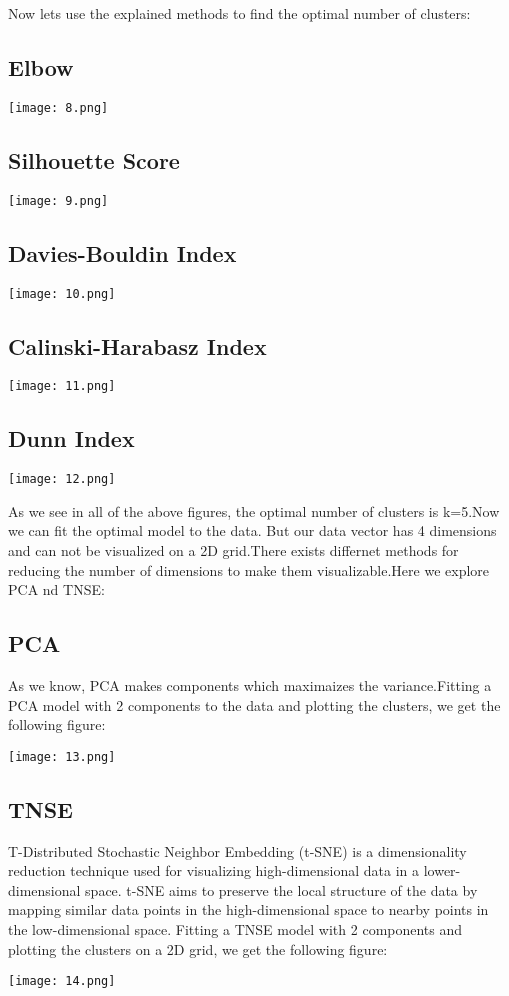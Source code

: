 \documentclass{article}
\begin{document}
Now lets use the explained methods to find the optimal number of clusters:

\subsection*{Elbow}

\texttt{[image: 8.png]}

\subsection*{Silhouette Score}

\texttt{[image: 9.png]}

\subsection*{Davies-Bouldin Index}

\texttt{[image: 10.png]}

\subsection*{Calinski-Harabasz Index}

\texttt{[image: 11.png]}


\subsection*{Dunn Index}

\texttt{[image: 12.png]}

As we see in all of the above figures, the optimal number of clusters is k=5.Now we can fit the optimal model to the data.
But our data vector has 4 dimensions and can not be visualized on a 2D grid.There exists differnet methods for reducing the number of 
dimensions to make them visualizable.Here we explore PCA nd TNSE:

\subsection*{PCA}
As we know, PCA makes components which maximaizes the variance.Fitting a PCA model with 2 components to the data and plotting the clusters,
 we get the following figure:

 \texttt{[image: 13.png]}

\subsection*{TNSE}
T-Distributed Stochastic Neighbor Embedding (t-SNE) is a dimensionality reduction technique used for visualizing high-dimensional data in a lower-dimensional space.
t-SNE aims to preserve the local structure of the data by mapping similar data points in the high-dimensional space to nearby points in the low-dimensional space.
Fitting a TNSE model with 2 components and plotting the clusters on a 2D grid, we get the following figure:

\texttt{[image: 14.png]}
\end{document}
